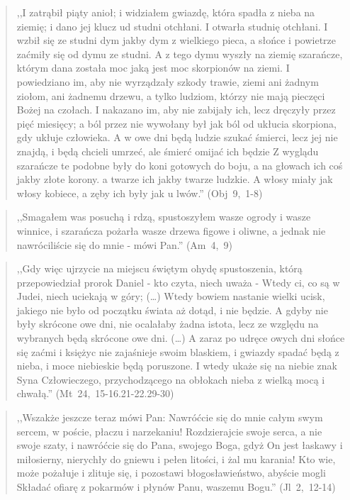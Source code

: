\documentclass[10pt,a4paper,oneside]{article}
\begin{document}
\begin{quote}
,,I zatrąbił piąty anioł; i widziałem gwiazdę, która spadła z nieba na ziemię; i dano jej klucz ud studni otchłani. I otwarła studnię otchłani. I wzbił się ze studni dym jakby dym z wielkiego pieca, a słońce i powietrze zaćmiły się od dymu ze studni. A z tego dymu wyszły na ziemię szarańcze, którym dana została moc jaką jest moc skorpionów na ziemi. I powiedziano im, aby nie wyrządzały szkody trawie, ziemi ani żadnym ziołom, ani żadnemu drzewu, a tylko ludziom, którzy nie mają pieczęci Bożej na czołach. I nakazano im, aby nie zabijały ich, lecz dręczyły przez pięć miesięcy; a ból przez nie wywołany był jak ból od ukłucia skorpiona, gdy ukłuje człowieka. A w owe dni będą ludzie szukać śmierci, lecz jej nie znajdą, i będą chcieli umrzeć, ale śmierć omijać ich będzie Z wyglądu szarańcze te podobne były do koni gotowych do boju, a na głowach ich coś jakby złote korony. a twarze ich jakby twarze ludzkie. A włosy miały jak włosy kobiece, a zęby ich były jak u lwów.'' \mbox{(Obj 9, 1-8)}
\end{quote}
\begin{quote}
,,Smagałem was posuchą i rdzą, spustoszyłem wasze ogrody i wasze winnice, i szarańcza pożarła wasze drzewa figowe i oliwne, a jednak nie nawróciliście się do mnie - mówi Pan.'' \mbox{(Am 4, 9)}
\end{quote}
\begin{quote}
,,Gdy więc ujrzycie na miejscu świętym ohydę spustoszenia, którą przepowiedział prorok Daniel - kto czyta, niech uważa - Wtedy ci, co są w Judei, niech uciekają w góry; (\ldots) Wtedy bowiem nastanie wielki ucisk, jakiego nie było od początku świata aż dotąd, i nie będzie. A gdyby nie były skrócone owe dni, nie ocalałaby żadna istota, lecz ze względu na wybranych będą skrócone owe dni. (\ldots) A zaraz po udręce owych dni słońce się zaćmi i księżyc nie zajaśnieje swoim blaskiem, i gwiazdy spadać będą z nieba, i moce niebieskie będą poruszone. I wtedy ukaże się na niebie znak Syna Człowieczego, przychodzącego na obłokach nieba z wielką mocą i chwałą.'' \mbox{(Mt 24, 15-16.21-22.29-30)}
\end{quote}
\begin{quote}
,,Wszakże jeszcze teraz mówi Pan: Nawróćcie się do mnie całym swym sercem, w poście, płaczu i narzekaniu! Rozdzierajcie swoje serca, a nie swoje szaty, i nawróćcie się do Pana, swojego Boga, gdyż On jest łaskawy i miłosierny, nierychły do gniewu i pełen litości, i żal mu karania! Kto wie, może pożałuje i zlituje się, i pozostawi błogosławieństwo, abyście mogli Składać ofiarę z pokarmów i płynów Panu, waszemu Bogu.'' \mbox{(Jl 2, 12-14)}
\end{quote}
\end{document}
